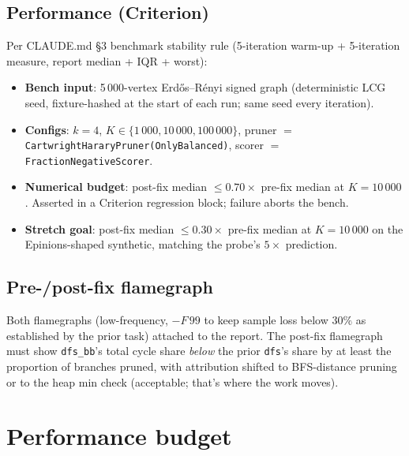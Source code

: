 \documentclass[a4paper,11pt]{article}
\begin{document}
\subsection*{Performance (Criterion)}

Per CLAUDE.md \S3 benchmark stability rule (5-iteration warm-up +
5-iteration measure, report median + IQR + worst):

\begin{itemize}
  \item \textbf{Bench input}: 5\,000-vertex Erd\H{o}s--R\'enyi signed
    graph (deterministic LCG seed, fixture-hashed at the start of
    each run; same seed every iteration).
  \item \textbf{Configs}: $k{=}4$, $K \in \{1\,000, 10\,000, 100\,000\}$,
    pruner $=$ \texttt{CartwrightHararyPruner(OnlyBalanced)}, scorer
    $=$ \texttt{FractionNegativeScorer}.
  \item \textbf{Numerical budget}: post-fix median $\le 0.70 \times$
    pre-fix median at $K{=}10\,000$. Asserted in a Criterion regression
    block; failure aborts the bench.
  \item \textbf{Stretch goal}: post-fix median $\le 0.30 \times$ pre-fix
    median at $K{=}10\,000$ on the Epinions-shaped synthetic, matching
    the probe's $5\times$ prediction.
\end{itemize}

\subsection*{Pre-/post-fix flamegraph}

Both flamegraphs (low-frequency, $-F\,99$ to keep sample loss below
$30\%$ as established by the prior task) attached to the report. The
post-fix flamegraph must show \texttt{dfs\_bb}'s total cycle share
\emph{below} the prior \texttt{dfs}'s share by at least the proportion
of branches pruned, with attribution shifted to BFS-distance pruning
or to the heap min check (acceptable; that's where the work moves).

\section*{Performance budget}
\end{document}

